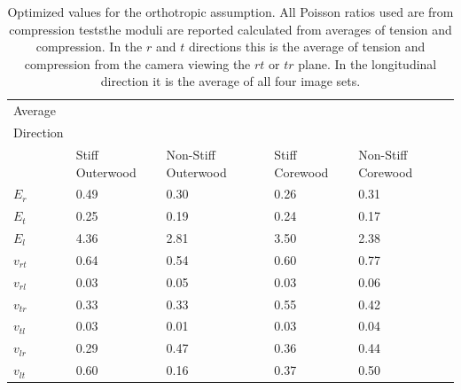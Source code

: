 \documentclass[10pt]{article}
\begin{document}
\begin{table}
\caption[Averaged orthotropic material constants]{Optimized values for the orthotropic assumption. All Poisson ratios used are from compression teststhe moduli are reported calculated from averages of tension and compression. In the \(r\) and \(t\) directions this is the average of tension and compression from the camera viewing the \(rt\) or \(tr\) plane. In the longitudinal direction it is the average of all four image sets.}
\label{table:optermised vals average}
\begin{tabular}{lllll}
\hline
Average	&	    &	    &	    &   \\
Direction&  	&	    &	    &   \\
	    &Stiff Outerwood	    &Non-Stiff Outerwood	    &Stiff Corewood	    &Non-Stiff Corewood \\
\(E_r\)	    &0.49	&0.30	&0.26	&0.31\\
\(E_t\)	    &0.25	&0.19	&0.24	&0.17\\
\(E_l\)	    &4.36	&2.81	&3.50	&2.38\\
\(v_{rt}\)	&0.64	&0.54	&0.60	&0.77\\
\(v_{rl}\)	&0.03	&0.05	&0.03	&0.06\\
\(v_{tr}\)	&0.33	&0.33	&0.55	&0.42\\
\(v_{tl}\)	&0.03	&0.01	&0.03	&0.04\\
\(v_{lr}\)	&0.29	&0.47	&0.36	&0.44\\
\(v_{lt}\)	&0.60	&0.16	&0.37	&0.50\\

\hline
\end{tabular}
\end{table}
\end{document}
